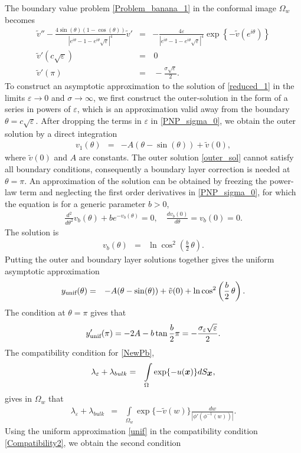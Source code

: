 \documentclass[12pt]{article}
\newcommand{\ds}{\displaystyle}
\newcommand{\beq}{\begin{eqnarray}}
\newcommand{\eeq}{\end{eqnarray}}
\newcommand{\eps}{\varepsilon}
\newcommand{\x}{\mbox{\boldmath$x$}}
\begin{document}
{The boundary value problem \eqref{Problem_banana_1} in the conformal image $\Omega_{w}$ becomes
\beq\label{PNP_sigma_0}
\tilde v''-\frac{4\sin(\theta)(1-\cos(\theta))}{|e^{i\theta}-1-e^{i\theta}\sqrt{\eps}|^4}\tilde v'&=&-\frac{4\eps}{|e^{i\theta}-1-e^{i\theta}\sqrt{\eps}|^4}\exp \left\{-\ds \tilde v(e^{i\theta})
\right\}\label{reduced_1}\\
\tilde v'(c\sqrt{\eps})&=&\,0\label{req}\nonumber\\
\tilde v'(\pi)& =&\,-\frac{\sigma \sqrt{\eps}}{2 }.\nonumber
\eeq
To construct an asymptotic approximation to the solution of \eqref{reduced_1} in the limits $\eps\to0$ and $\sigma\to\infty$, we first construct the outer-solution in the form of a series in powers of $\eps$, which is an approximation valid away from the boundary $\theta=c\sqrt{\eps}$.  After dropping the terms in $\eps$ in \ref{PNP_sigma_0}, we obtain the outer solution by  a direct integration
\beq\label{outer_sol}
v_1(\theta)&=& -A(\theta-\sin(\theta))+\tilde v(0),
\eeq
where $\tilde v(0)$ and  $A$ are constants. The outer solution \eqref{outer_sol} cannot satisfy all boundary conditions, consequently a boundary layer correction is needed at $\theta=\pi$. An approximation of the solution can be obtained by freezing the power-law term  and neglecting the first order derivatives in \eqref{PNP_sigma_0}, for
which the equation is for a generic parameter $b>0$,
\begin{align*}
\frac{d^2 }{d \theta^2} v_b(\theta) +b  e^{\ds-v_b(\theta)}=0,\quad\frac{d v_b(0)}{d \theta}= v_b(0)=0.
\end{align*}
The solution is \cite{PhysD2016}
\beq \label{blowups}
v_b(\theta)&=&\ln\cos^2\left(\frac{b}{2}\,\theta\right).
\eeq
Putting the outer and boundary layer solutions together gives the uniform asymptotic approximation
\beq\label{unif}
y_{\mbox{\scriptsize unif}}(\theta)&=&-A(\theta-\sin(\theta))+\tilde v(0)+\ln\cos^2\left(\frac{b}{2}\,\theta\right).
\eeq
The condition at {$\theta=\pi$} gives that
\beq\label{cond}
{y_{\mbox{\scriptsize unif}}'(\pi)=-2A -b\tan\frac{b}{2}\pi= \ds-\frac{\sigma_\eps
		\sqrt{\eps}}{2}.\nonumber}
\eeq
The compatibility condition for  \eqref{NewPb},
\beq\label{Compatibility2new}
\lambda_{\eps} + \lambda_{bulk}&=& \int\limits_{\Omega}\exp \{-  u(\x)\} dS_{\x},
\eeq
gives in {$\Omega_w$} that
\beq\label{Compatibility2}
\lambda_{\eps} + \lambda_{bulk}&=& \int\limits_{{\Omega_w}}\exp \{-\tilde v(w)\} \frac{dw}{|\phi'(\phi^{-1}(w))|}.
\eeq
Using the uniform approximation \eqref{unif} in the compatibility condition \eqref{Compatibility2}, we obtain the second condition
}
\end{document}
